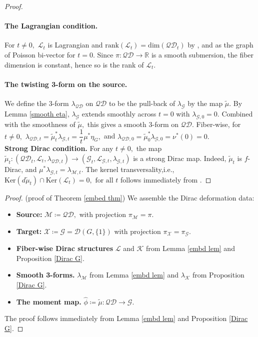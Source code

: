 \documentclass[reqno]{amsart}
\theoremstyle{plain}
\theoremstyle{definition}
\newcommand{\QD}{\mathcal{QD}}
\newcommand{\R}{\mathbb{R}}
\newcommand{\G}{\mathcal{G}}
\newcommand{\too}{\longrightarrow}
\newcommand{\M}{\mathcal{M}}
\renewcommand{\L}{\mathcal{L}}
\newcommand{\X}{\mathcal{X}}
\newcommand{\D}{\mathcal{D}}
\newcommand{\Ker}{\text{Ker}}
\newcommand{\K}{\mathcal{K}}
\begin{document}
\begin{proof}
\paragraph{\textbf{The Lagrangian condition.}} For $t\neq 0,$ $\L_t$ is Lagrangian and $\text{rank}(\L_t) = \text{dim}(\QD_t)$ by \cite[]{bursztyn2005dirac}, and as the graph of Poisson bi-vector for $t = 0.$ Since $\pi: \QD \too \R$ is a smooth submersion, the fiber dimension is constant, hence so is the rank of $\L_t.$\\


\paragraph{\textbf{The twisting 3-form on the source.}} We define the 3-form $\lambda_{\QD}$ on $\QD$ to be the pull-back of $\lambda_{\G}$ by the map $\tilde{\mu}.$ By Lemma \ref{smooth eta}, $\lambda_{\G}$ extends smoothly across $t = 0$ with $\lambda_{\G,0} = 0.$ Combined with the smoothness of $\tilde{\mu},$ this gives a smooth 3-form on $\QD.$ Fiber-wise, for $t\neq 0,$ $\lambda_{\QD,t} = \tilde{\mu}_{t}^{*}\lambda_{\G,t} = \dfrac{1}{t}\mu^{*}\eta_{G},$ and $\lambda_{\QD,0} = \tilde{\mu}_{0}^{*}\lambda_{\G,0} = \nu^{*}(0) = 0.$\\


\noindent\textbf{Strong Dirac condition.} For any $t\neq 0,$ the map $\tilde{\mu}_t: (\QD_t,\L_t,\lambda_{\QD,t}) \too (\G_t,\L_{\G,t},\lambda_{\G,t})$ is a strong Dirac map. Indeed, $\tilde{\mu}_t$ is $f$-Dirac, and $\mu^{*}\lambda_{\G,t} = \lambda_{\M,t}.$ The kernel transversality,i.e., $\Ker(d\tilde{\mu}_t)\cap \Ker(\L_t) = 0, \text{ for all }  t$ follows immediately from \cite[]{bursztyn2005dirac}.
\end{proof}

\begin{proof}(proof of Theorem \ref{embed thm})
We assemble the Dirac deformation data:
\begin{itemize}
    \item \textbf{Source:} $\M \coloneqq \QD,$ with projection $\pi_{\M} = \pi.$
    \item \textbf{Target:} $ \X \coloneqq \G = \D(G,\{1\})$ with projection $\pi_\X = \pi_{\G}.$
    \item \textbf{Fiber-wise Dirac structures} $\L$ and $\K$ from Lemma \ref{embd lem} and Proposition \ref{Dirac G}.
    \item \textbf{Smooth 3-forms.} $\lambda_{\M}$ from Lemma \ref{embd lem} and $\lambda_\K$ from Proposition \ref{Dirac G}.
    \item \textbf{The moment map.} $\widehat{\phi} \coloneqq \tilde{\mu}: \QD \too \G.$
\end{itemize}
The proof follows immediately from Lemma \ref{embd lem} and Proposition \ref{Dirac G}.
\end{proof}
\end{document}
